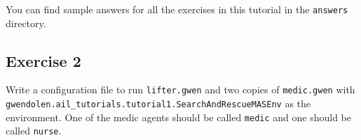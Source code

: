You can find sample answers for all the exercises in this tutorial in the \texttt{answers} directory.

\subsection{Exercise 2}
Write a configuration file to run \texttt{lifter.gwen} and two copies of \texttt{medic.gwen}  with \texttt{gwendolen.ail\_tutorials.tutorial1.SearchAndRescueMASEnv} as the environment.  One of the medic agents should be called \texttt{medic} and one should be called \texttt{nurse}.

